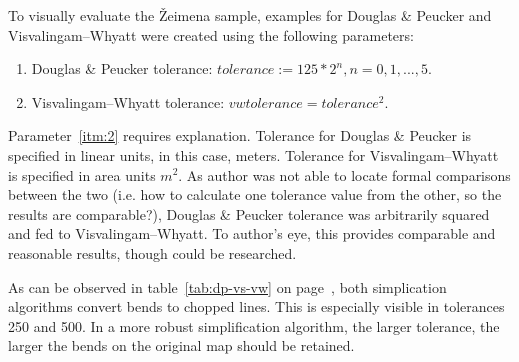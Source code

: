 \documentclass[a4paper]{article}
\newcommand{\DP}{Douglas \& Peucker}
\newcommand{\VW}{Visvalingam--Whyatt}
\begin{document}
To visually evaluate the Žeimena sample, examples for {\DP} and {\VW}
were created using the following parameters:

\begin{enumerate}[label=(\Roman*)]
    \item {\DP} tolerance: $tolerance := 125 * 2^n, n = 0,1,...,5$.
    \item {\VW} tolerance: $vwtolerance = tolerance ^ 2$\label{itm:2}.
\end{enumerate}

Parameter~\ref{itm:2} requires explanation. Tolerance for {\DP} is specified in
linear units, in this case, meters. Tolerance for {\VW} is specified in area
units $m^2$. As author was not able to locate formal comparisons between the
two (i.e. how to calculate one tolerance value from the other, so the results
are comparable?), {\DP} tolerance was arbitrarily squared and fed to {\VW}. To
author's eye, this provides comparable and reasonable results, though could be
researched.

As can be observed in table~\ref{tab:dp-vs-vw} on page~\pageref{tab:dp-vs-vw},
both simplication algorithms convert bends to chopped lines. This is especially
visible in tolerances 250 and 500. In a more robust simplification algorithm,
the larger tolerance, the larger the bends on the original map should be
retained.
\end{document}
